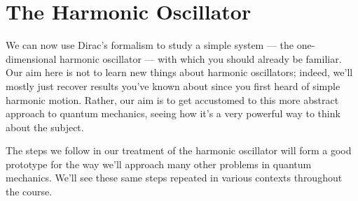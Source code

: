 \documentclass{article}
\theoremstyle{plain}\theoremheaderfont{\normalfont\itshape}\theorembodyfont{\rmfamily}\theoremseparator{.}\newtheorem*{rem}{Remark}\newtheorem*{ex}{Example}\newtheorem*{proof}{Proof}\newtheorem*{altp}{Alternative proof}
\theoremstyle{plain}\theoremheaderfont{\normalfont\bfseries}\theorembodyfont{\rmfamily}\theoremseparator{.}\newtheorem{thm}{Theorem}[section]\newtheorem{lem}[thm]{Lemma}\newtheorem{prop}[thm]{Proposition}\newtheorem*{cor}{Corollary}\newtheorem{defn}[thm]{Definition}\newtheorem{clm}[thm]{Claim}\newtheorem{clminproof}{Claim}
\theoremstyle{break}\theoremheaderfont{\normalfont\itshape}\theorembodyfont{\rmfamily}\theoremseparator{.\medskip}\newtheorem*{proofskip}{Proof}\newtheorem*{exs}{Examples}\newtheorem*{rems}{Remarks}
\theoremstyle{break}\theoremheaderfont{\normalfont\bfseries}\theorembodyfont{\rmfamily}\theoremseparator{.\medskip}\newtheorem{lemskip}[thm]{Lemma}\newtheorem{defnskip}[thm]{Definition}\newtheorem{propskip}[thm]{Proposition}\newtheorem{thmskip}[thm]{Theorem}
\numberwithin{equation}{section}
\begin{document}
    \newpage
    \section{The Harmonic Oscillator}
    We can now use Dirac's formalism to study a simple system --- the one-dimensional harmonic oscillator --- with which you should already be familiar. Our aim here is not to learn new things about harmonic oscillators; indeed, we'll mostly just recover results you've known about since you first heard of simple harmonic motion. Rather, our aim is to get accustomed to this more abstract approach to quantum mechanics, seeing how it's a very powerful way to think about the subject.
    
    The steps we follow in our treatment of the harmonic oscillator will form a good prototype for the way we'll approach many other problems in quantum mechanics. We'll see these same steps repeated in various contexts throughout the course.
\end{document}
